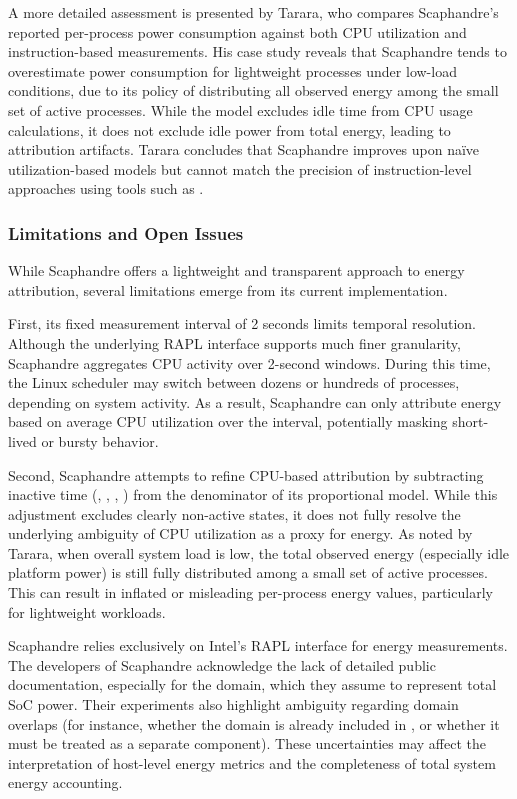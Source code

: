 A more detailed assessment is presented by Tarara\parencite{Tarara2023CpuUtilization}, who compares Scaphandre’s reported per-process power consumption against both CPU utilization and instruction-based measurements. His case study reveals that Scaphandre tends to overestimate power consumption for lightweight processes under low-load conditions, due to its policy of distributing all observed energy among the small set of active processes. While the model excludes idle time from CPU usage calculations, it does not exclude idle power from total energy, leading to attribution artifacts. Tarara concludes that Scaphandre improves upon naïve utilization-based models but cannot match the precision of instruction-level approaches using tools such as .

\subsubsection{Limitations and Open Issues}
\label{sec:scaphandre-limitations}

While Scaphandre offers a lightweight and transparent approach to energy attribution, several limitations emerge from its current implementation.

First, its fixed measurement interval of 2 seconds limits temporal resolution. Although the underlying RAPL interface supports much finer granularity, Scaphandre aggregates CPU activity over 2-second windows. During this time, the Linux scheduler may switch between dozens or hundreds of processes, depending on system activity. As a result, Scaphandre can only attribute energy based on average CPU utilization over the interval, potentially masking short-lived or bursty behavior.

Second, Scaphandre attempts to refine CPU-based attribution by subtracting inactive time (, , , ) from the denominator of its proportional model. While this adjustment excludes clearly non-active states, it does not fully resolve the underlying ambiguity of CPU utilization as a proxy for energy. As noted by Tarara\parencite{Tarara2023CpuUtilization}, when overall system load is low, the total observed energy (especially idle platform power) is still fully distributed among a small set of active processes. This can result in inflated or misleading per-process energy values, particularly for lightweight workloads.

Scaphandre relies exclusively on Intel’s RAPL interface for energy measurements. The developers of Scaphandre acknowledge the lack of detailed public documentation, especially for the  domain, which they assume to represent total SoC power. Their experiments also highlight ambiguity regarding domain overlaps (for instance, whether the  domain is already included in , or whether it must be treated as a separate component). These uncertainties may affect the interpretation of host-level energy metrics and the completeness of total system energy accounting.

